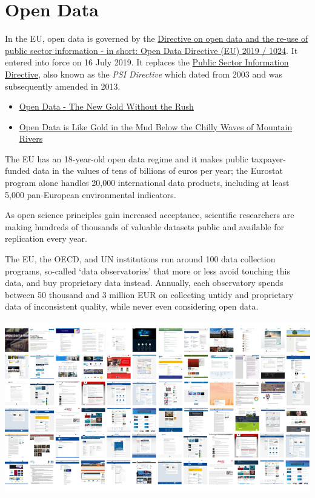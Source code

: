 \documentclass[
  a4paper,
  openany, a4paper, oneside]{book}
\providecommand{\tightlist}{%
  \setlength{\itemsep}{0pt}\setlength{\parskip}{0pt}}
\begin{document}
\hypertarget{open-data}{%
\chapter{Open Data}\label{open-data}}

In the EU, open data is governed by the \href{https://eur-lex.europa.eu/legal-content/EN/TXT/?qid=1561563110433\&uri=CELEX:32019L1024}{Directive on open data and the re-use of public sector information - in short: Open Data Directive (EU) 2019 / 1024}. It entered into force on 16 July 2019. It replaces the \href{https://eur-lex.europa.eu/legal-content/en/ALL/?uri=CELEX:32003L0098}{Public Sector Information Directive}, also known as the \emph{PSI Directive} which dated from 2003 and was subsequently amended in 2013.

\begin{itemize}
\tightlist
\item
  \href{https://dataandlyrics.com/post/2021-06-18-gold-without-rush/}{Open Data - The New Gold Without the Rush}
\item
  \href{https://greendeal.dataobservatory.eu/post/2021-06-10-founder-daniel-antal/}{Open Data is Like Gold in the Mud Below the Chilly Waves of Mountain Rivers}
\end{itemize}

The EU has an 18-year-old open data regime and it makes public taxpayer-funded data in the values of tens of billions of euros per year; the Eurostat program alone handles 20,000 international data products, including at least 5,000 pan-European environmental indicators.

As open science principles gain increased acceptance, scientific researchers are making hundreds of thousands of valuable datasets public and available for replication every year.

The EU, the OECD, and UN institutions run around 100 data collection programs, so-called `data observatories' that more or less avoid touching this data, and buy proprietary data instead. Annually, each observatory spends between 50 thousand and 3 million EUR on collecting untidy and proprietary data of inconsistent quality, while never even considering open data.

\begin{center}\includegraphics[width=11.11in]{plots/screenshots/observatory_collage_16x9_800} \end{center}
\end{document}
